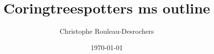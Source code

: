 \documentclass{article}\usepackage[]{graphicx}\usepackage[]{xcolor}
\begin{document}

\title{Coringtreespotters ms outline}
\author{Christophe Rouleau-Desrochers}
\date{\today}
\maketitle

\newcommand{\Arub}{\textit{A. rubrum}}
\newcommand{\Asac}{\textit{A. saccharum}}
\newcommand{\Afla}{\textit{A. flava}}
\newcommand{\Ball}{\textit{B. alleghaniensis}}
\newcommand{\Bnig}{\textit{B. nigra}}
\newcommand{\Cgla}{\textit{C. glabra}}
\newcommand{\Cova}{\textit{C. ovata}}
\newcommand{\Pdel}{\textit{P. deltoides}}
\newcommand{\Qalb}{\textit{Q. alba}}
\newcommand{\Qrub}{\textit{Q. rubra}}
\newcommand{\Tame}{\textit{T. americana}}   




\end{document}
